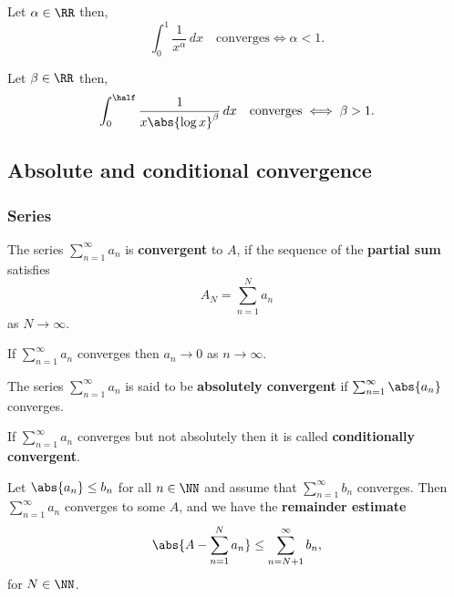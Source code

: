 \documentclass[12pt, a4paper]{article}
\begin{document}
\begin{mdthm}
    Let \(\alpha \in \RR\) then, 
    \[\int_{0}^{1} \frac{1}{x^{\alpha}} \, dx \quad \text{converges} \iff \alpha <1.\]
\end{mdthm}

\begin{mdthm}
    Let \(\beta \in \RR\) then,
    \[\int_0^{\half} \frac{1}{x\abs{\log x}^{\beta}} \, dx \quad \text{converges} \iff \beta>1.\]
\end{mdthm}

\subsection{Absolute and conditional convergence}

\subsubsection{Series}

\begin{definition}
    The series \(\sum_{n=1}^{\infty} a_n\) is \textbf{convergent} to \(A\), if the sequence of the \textbf{partial sum} satisfies
    \[A_N = \sum_{n=1}^{N} a_n\]
    as \(N \to \infty\).
\end{definition}

\begin{theorem}
    If \(\sum_{n=1}^{\infty} a_n\) converges then \(a_n \to 0\) as \(n \to \infty\).
\end{theorem}

\begin{definition}
    The series \(\sum_{n=1}^{\infty} a_n\) is said to be \textbf{absolutely convergent} if \(\sum_{n=1}^{\infty} \abs{a_n}\) converges.
\end{definition}

\begin{definition}
    If \(\sum_{n=1}^{\infty} a_n\) converges but not absolutely then it is called \textbf{conditionally convergent}.
\end{definition}

\begin{mdlemma}
    Let \(\abs{a_n} \leq b_n\) for all \(n \in \NN\) and assume that \(\sum_{n=1}^{\infty} b_n\) converges. Then \(\sum_{n=1}^{\infty} a_n\) converges to some \(A\), and we have the \textbf{remainder estimate} 
    \[\abs{A-\sum_{n=1}^{N} a_n} \leq \sum_{n=N+1}^{\infty} b_n,\]
    for \(N \in \NN\).
\end{mdlemma}
\end{document}
